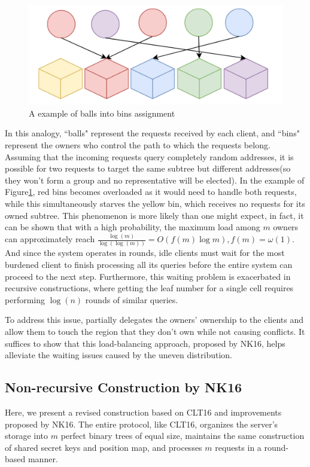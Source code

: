 \documentclass[fontsize=11pt]{article}
\begin{document}
\begin{figure}
    \centering
    \includegraphics[width=1\linewidth]{pics/balls_n_bins.png}
    \caption{A example of balls into bins assignment}
    \label{fig:balls-n-bins}
\end{figure}

In this analogy, ``balls" represent the requests received by each client, and ``bins" represent the owners who control the path to which the requests belong. Assuming that the incoming requests query completely random addresses, it is possible for two requests to target the same subtree but different addresses(so they won’t form a group and no representative will be elected). In the example of Figure\ref{fig:balls-n-bins}, red bins becomes overloaded as it would need to handle both requests, while this simultaneously starves the yellow bin, which receives no requests for its owned subtree. This phenomenon is more likely than one might expect, in fact, it can be shown that with a high probability, the maximum load among $m$ owners can approximately reach $\frac{\log(m)}{\log(\log(m))} = O(f(m)\log m), f(m) = \omega(1)$. And since the system operates in rounds, idle clients must wait for the most burdened client to finish processing all its queries before the entire system can proceed to the next step. Furthermore, this waiting problem is exacerbated in recursive constructions, where getting the leaf number for a single cell requires performing $\log(n)$ rounds of similar queries.


To address this issue, \cite{NK16} partially delegates the owners' ownership to the clients and allow them to touch the region that they don’t own while not causing conflicts. It suffices to show that this load-balancing approach, proposed by NK16, helps alleviate the waiting issues caused by the uneven distribution.

\subsection{Non-recursive Construction by NK16}
Here, we present a revised construction based on CLT16 and improvements proposed by NK16. The entire protocol, like CLT16, organizes the server's storage into $m$ perfect binary trees of equal size, maintains the same construction of shared secret keys and position map, and processes $m$ requests in a round-based manner.
\end{document}

